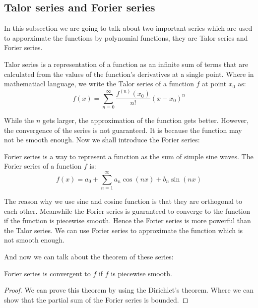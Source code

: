 \documentclass{article}
\begin{document}
\subsection{Talor series and Forier series}
In this subsection we are going to talk about two important series which are used to apporximate the functions by polynomial functions,
they are Talor series and Forier series. 
\begin{definition}
Talor series is a representation of a function as an infinite sum of terms that are calculated from the values of the function's derivatives at a single point.
Where in mathematiacl language, we write the Talor series of a function $f$ at point $x_0$ as: 
\begin{equation*}
  f(x)=\sum_{n=0}^\infty \frac{f^{(n)}(x_0)}{n!}(x-x_0)^n
  \end{equation*}
\end{definition}
While the $n$ gets larger, the approximation of the function gets better. However, the convergence of the series is not guaranteed.
It is because the function may not be smooth enough. 
Now we shall introduce the Forier series:
\begin{definition}
  Forier series is a way to represent a function as the sum of simple sine waves. The Forier series of a function $f$ is:
  \begin{equation}
    f(x)=a_0+\sum_{n=1}^\infty a_n\cos(nx)+b_n\sin(nx) 
  \end{equation}
\end{definition}
The reason why we use sine and cosine function is that they are orthogonal to each other.
Meanwhile the Forier series is guaranteed to converge to the function if the function is piecewise smooth.
Hence the Forier series is more powerful than the Talor series.
We can use Forier series to approximate the function which is not smooth enough.

And now we can talk about the theorem of these series:
\begin{theorem}
  Forier series is convergent to $f$ if $f$ is piecewise smooth.
  
\end{theorem}

\begin{proof}
  We can prove this theorem by using the Dirichlet's theorem.
  Where we can show that the partial sum of the Forier series is bounded.
\end{proof}
\end{document}
